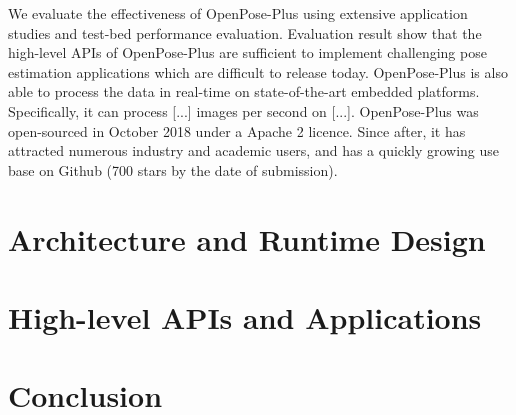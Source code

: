 \documentclass[twoside,11pt]{article}
\begin{document}
We evaluate the effectiveness of OpenPose-Plus 
using extensive application studies and
test-bed performance evaluation. 
Evaluation result show that the high-level APIs of OpenPose-Plus
are sufficient to implement challenging pose estimation
applications which are difficult to release today.
OpenPose-Plus is also able to process the data in real-time
on state-of-the-art embedded platforms. Specifically, it can
process [...] images per second on [...].
OpenPose-Plus was open-sourced in October 2018 under a 
Apache 2 licence. Since after, it has attracted numerous 
industry and academic users, and has a quickly growing use base on Github (700 stars by the date of submission). 

\section{Architecture and Runtime Design}

\section{High-level APIs and Applications}

\section{Conclusion}




\end{document}
